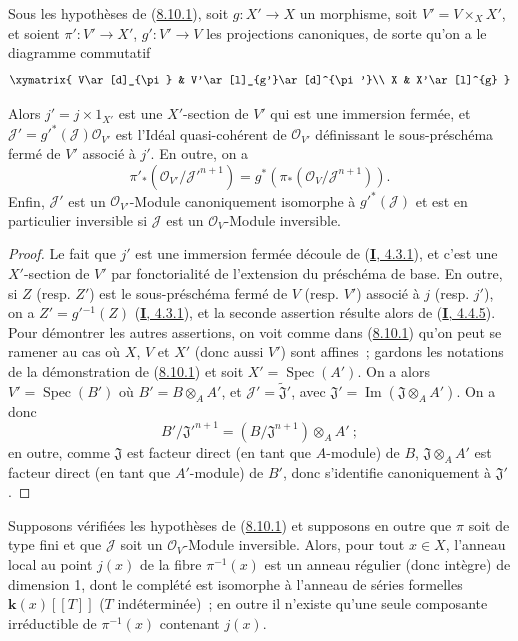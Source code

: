 \begin{lemma}[8.10.2]
\label{II.8.10.2-fr}
Sous les hypothèses de (\hyperref[II.8.10.1-fr]{8.10.1}), soit
$g:X'\to X$ un morphisme,
soit $V'=V\times_X X'$, et soient $\pi':V'\to X'$,
$g':V'\to V$ les projections canoniques, de sorte qu'on a le diagramme
commutatif
\[
  \xymatrix{
    V\ar[d]_{\pi} & V'\ar[l]_{g'}\ar[d]^{\pi'}\\
    X & X'\ar[l]^{g}
  }
\]

Alors $j'=j\times1_{X'}$ est une $X'$-section de $V'$ qui est une immersion
fermée, et $\mathcal{J}'=g'^*(\mathcal{J})\mathcal{O}_{V'}$ est l'Idéal
quasi-cohérent de $\mathcal{O}_{V'}$ définissant le sous-préschéma fermé de
$V'$ associé à $j'$. En outre, on a
\[
  \pi'_*(\mathcal{O}_{V'}/\mathcal{J}'^{n+1})
  =g^*(\pi_*(\mathcal{O}_V/\mathcal{J}^{n+1})).
\]
Enfin, $\mathcal{J}'$ est un $\mathcal{O}_{V'}$-Module canoniquement isomorphe
à $g'^*(\mathcal{J})$ et est en particulier inversible si $\mathcal{J}$ est
un $\mathcal{O}_V$-Module inversible.
\end{lemma}

\begin{proof}
Le fait que $j'$ est une immersion fermée découle de
(\hyperref[I.4.3.1-fr]{\textbf{I}, 4.3.1}), et c'est une $X'$-section de $V'$ par
fonctorialité de l'extension du préschéma de base. En outre, si $Z$ (resp.
$Z'$) est le sous-préschéma fermé de $V$ (resp. $V'$) associé à $j$ (resp.
$j'$), on a $Z'=g'{}^{-1}(Z)$
(\hyperref[I.4.3.1-fr]{\textbf{I}, 4.3.1}), et la seconde assertion résulte alors de
(\hyperref[I.4.4.5-fr]{\textbf{I}, 4.4.5}). Pour démontrer les autres assertions, on
voit comme dans (\hyperref[II.8.10.1-fr]{8.10.1}) qu'on peut se ramener au cas
où $X$, $V$ et $X'$ (donc aussi $V'$) sont affines~; gardons les notations de
la démonstration de (\hyperref[II.8.10.1-fr]{8.10.1}) et soit
$X'=\operatorname{Spec}(A')$. On a alors $V'=\operatorname{Spec}(B')$ où
$B'=B\otimes_A A'$, et $\mathcal{J}'=\widetilde{\mathfrak{J}}'$, avec
$\mathfrak{J}'=\operatorname{Im}(\mathfrak{J}\otimes_A A')$. On a donc
\[
  B'/\mathfrak{J}'^{n+1}=(B/\mathfrak{J}^{n+1})\otimes_A A'~;
\]
en outre, comme $\mathfrak{J}$ est facteur direct (en tant que $A$-module) de
$B$, $\mathfrak{J}\otimes_A A'$ est facteur direct (en tant que $A'$-module)
de $B'$, donc s'identifie canoniquement à $\mathfrak{J}'$.
\end{proof}

\begin{corollary}[8.10.3]
\label{II.8.10.3-fr}
Supposons vérifiées les hypothèses de (\hyperref[II.8.10.1-fr]{8.10.1}) et
supposons en outre que $\pi$ soit de type fini et que $\mathcal{J}$ soit un
$\mathcal{O}_V$-Module inversible. Alors, pour tout $x\in X$, l'anneau local
au point $j(x)$ de la fibre $\pi^{-1}(x)$ est un anneau régulier (donc
intègre) de dimension 1, dont le complété est isomorphe à l'anneau de séries
formelles $\boldsymbol{k}(x)[[T]]$ ($T$ indéterminée)~; en outre il n'existe qu'une seule
composante irréductible de $\pi^{-1}(x)$ contenant $j(x)$.
\end{corollary}

